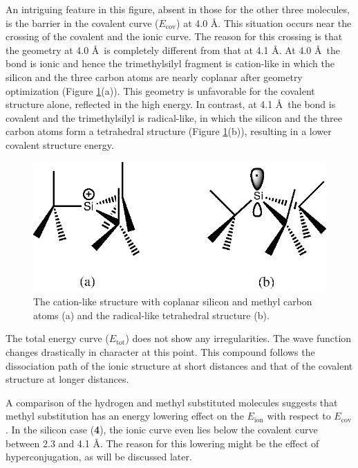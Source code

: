 An intriguing feature in this figure, absent in those for the other three molecules, is the barrier in the covalent curve ($E_\mathrm{cov}$) at 4.0 \AA. This situation occurs near the crossing of the covalent and the ionic curve. The reason for this crossing is that the geometry at 4.0 \AA\ is completely different from that at 4.1 \AA. At 4.0 \AA\ the bond is ionic and hence the trimethylsilyl fragment is cation-like in which the silicon and the three carbon atoms are nearly coplanar after geometry optimization (Figure \ref{ch3.fig.crossing}(a)). This geometry is unfavorable for the covalent structure alone, reflected in the high energy.  In contrast, at 4.1 \AA\  the bond is covalent and the trimethylsilyl is radical-like, in which the silicon and the three carbon atoms form a tetrahedral structure (Figure \ref{ch3.fig.crossing}(b)), resulting in a lower covalent structure energy. 
\begin{figure}[htbp]
\center
\includegraphics[scale=1.0]{dissociation/figures/crossing.eps}
\caption{The cation-like structure with coplanar silicon and methyl carbon atoms (a) and the radical-like tetrahedral structure (b).}
\label{ch3.fig.crossing}
\end{figure}
The total energy curve ($E_\mathrm{tot}$) does not show any irregularities.  The wave function changes drastically in character at this point. This compound follows the dissociation path of the ionic structure at short distances and that of the covalent structure at longer distances. 

A comparison of the hydrogen and methyl substituted molecules suggests that methyl substitution has an energy lowering effect on the $E_\mathrm{ion}$ with respect to $E_\mathrm{cov}$. In the silicon case (\textbf{4}), the ionic curve even lies below the covalent curve between 2.3 and 4.1 \AA. The reason for this lowering might be the effect of hyperconjugation, as will be discussed later.


